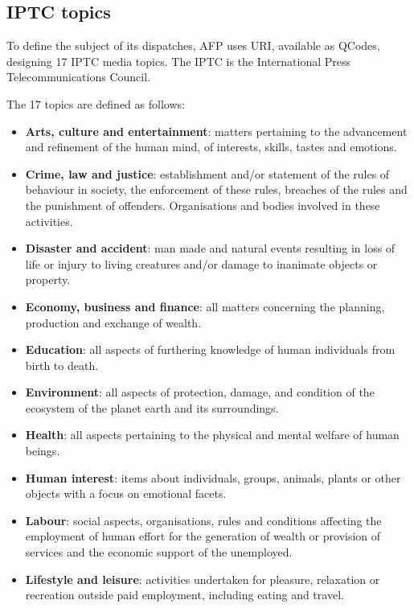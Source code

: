 \subsection{IPTC topics\label{Sec:OATopic}}

To define the subject of its dispatches, AFP uses URI, available as QCodes, designing 17 IPTC media topics. The IPTC is the International Press Telecommunications Council. 

The 17 topics are defined as follows:

\begin{itemize}
\item \textbf{Arts, culture and entertainment}: matters pertaining to the advancement and refinement of the human mind, of interests, skills, tastes and emotions.
\item \textbf{Crime, law and justice}: establishment and/or statement of the rules of behaviour in society, the  enforcement of these rules, breaches of the rules and the punishment of offenders.
Organisations and bodies involved in these activities. 
\item \textbf{Disaster and accident}: man made and natural events resulting in loss of life or injury to living creatures and/or damage to inanimate objects or property.
\item \textbf{Economy, business and finance}: all matters concerning the planning, production and exchange of wealth.  
\item \textbf{Education}: all aspects of furthering knowledge of human individuals from birth to death.
\item \textbf{Environment}: all aspects of protection, damage, and condition of the ecosystem of the planet earth and its surroundings.
\item \textbf{Health}: all aspects pertaining to the physical and mental welfare of human beings. 
\item \textbf{Human interest}: items about individuals, groups, animals, plants or other objects with a focus on emotional facets.
\item \textbf{Labour}: social aspects, organisations, rules and conditions affecting the employment of human effort for the generation of wealth or provision of services and the economic support of the unemployed.
\item \textbf{Lifestyle and leisure}: activities undertaken for pleasure, relaxation or recreation outside paid employment, including eating and travel.

\end{itemize}
